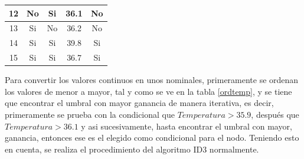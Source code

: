 \documentclass[twoside,spanish,ESP,MSc]{plantillaLabUPV}
\theoremstyle{definition}
\begin{document}
\begin{table}[!tbh]
\begin{tabular}{|c|c|c|c|c|}
		12          & No           & Si                                                                     & 36.1              & No             \\ \hline
		13          & Si           & No                                                                     & 36.2              & No             \\ \hline
		14          & Si           & Si                                                                     & 39.8              & Si             \\ \hline
		15          & Si           & Si                                                                     & 36.7              & Si             \\ \hline
	\end{tabular}
\end{table}

Para convertir los valores continuos en unos nominales, primeramente se ordenan los valores de menor a mayor, tal y como se ve en la tabla \ref{ordtemp}, y se tiene que encontrar el umbral con mayor ganancia de manera iterativa, es decir, primeramente se prueba con la condicional que $Temperatura > 35.9$, después que $Temperatura > 36.1$ y asi sucesivamente, hasta encontrar el umbral con mayor, ganancia, entonces ese es el elegido como condicional para el nodo. Teniendo esto en cuenta, se realiza el procedimiento del algoritmo ID3 normalmente.
\end{document}
